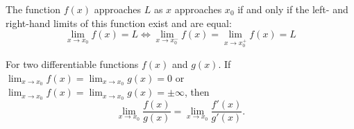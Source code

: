 \documentclass{article}
\begin{document}
\begin{theorem}
    The function \(f\left( x \right)\) approaches \(L\) as \(x\)
    approaches \(x_0\) if and only if the left- and right-hand limits
    of this function exist and are equal:
    \begin{equation*}
        \lim_{x \to x_0} f\left( x \right) = L \iff \lim_{x \to x_0^-} f\left( x \right) = \lim_{x \to x_0^+} f\left( x \right) = L
    \end{equation*}
\end{theorem}
\begin{theorem}
    For two differentiable functions \(f\left( x \right)\) and \(g\left( x \right)\).
    If \(\displaystyle \lim_{x\to x_0}f\left( x \right)=\lim_{x\to x_0}g\left( x \right)=0\)
    or \(\displaystyle \lim_{x\to x_0}f\left( x \right)=\displaystyle \lim_{x\to x_0}g\left( x \right)=\pm\infty\),
    then
    \begin{equation*}
        \lim_{x\to x_0}\frac{f\left( x \right)}{g\left( x \right)} = \lim_{x\to x_0}\frac{f'\left( x \right)}{g'\left( x \right)}.
    \end{equation*}
\end{theorem}
\end{document}
